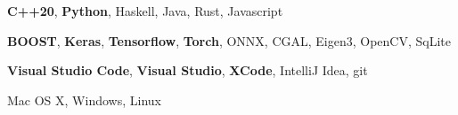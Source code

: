 %
%
%


	\begin{keywords}
			{
				\textbf{C++20}, 
				\textbf{Python},
				 Haskell, 
				 Java, 
				 Rust, 
				 Javascript
			}
			
			{
				\textbf{BOOST},
				\textbf{Keras},
				\textbf{Tensorflow}, 
				\textbf{Torch},
				ONNX, 
				CGAL, 
				Eigen3, 
				OpenCV,
				SqLite
			}
		
			{
				\textbf{Visual Studio Code},
				\textbf{Visual Studio}, 
				\textbf{XCode},
				IntelliJ Idea, 
				git
			}
		
			{
				Mac OS X, 
				Windows, 
				Linux
			}
	\end{keywords}